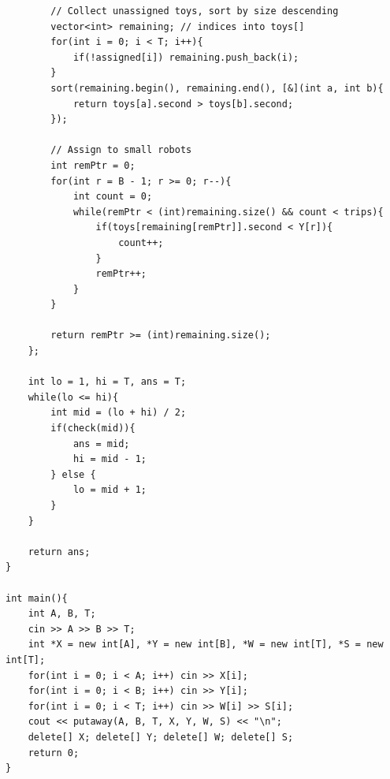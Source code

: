 \documentclass[11pt,a4paper]{article}
\begin{document}
\begin{lstlisting}
        // Collect unassigned toys, sort by size descending
        vector<int> remaining; // indices into toys[]
        for(int i = 0; i < T; i++){
            if(!assigned[i]) remaining.push_back(i);
        }
        sort(remaining.begin(), remaining.end(), [&](int a, int b){
            return toys[a].second > toys[b].second;
        });

        // Assign to small robots
        int remPtr = 0;
        for(int r = B - 1; r >= 0; r--){
            int count = 0;
            while(remPtr < (int)remaining.size() && count < trips){
                if(toys[remaining[remPtr]].second < Y[r]){
                    count++;
                }
                remPtr++;
            }
        }

        return remPtr >= (int)remaining.size();
    };

    int lo = 1, hi = T, ans = T;
    while(lo <= hi){
        int mid = (lo + hi) / 2;
        if(check(mid)){
            ans = mid;
            hi = mid - 1;
        } else {
            lo = mid + 1;
        }
    }

    return ans;
}

int main(){
    int A, B, T;
    cin >> A >> B >> T;
    int *X = new int[A], *Y = new int[B], *W = new int[T], *S = new int[T];
    for(int i = 0; i < A; i++) cin >> X[i];
    for(int i = 0; i < B; i++) cin >> Y[i];
    for(int i = 0; i < T; i++) cin >> W[i] >> S[i];
    cout << putaway(A, B, T, X, Y, W, S) << "\n";
    delete[] X; delete[] Y; delete[] W; delete[] S;
    return 0;
}
\end{lstlisting}
\end{document}
